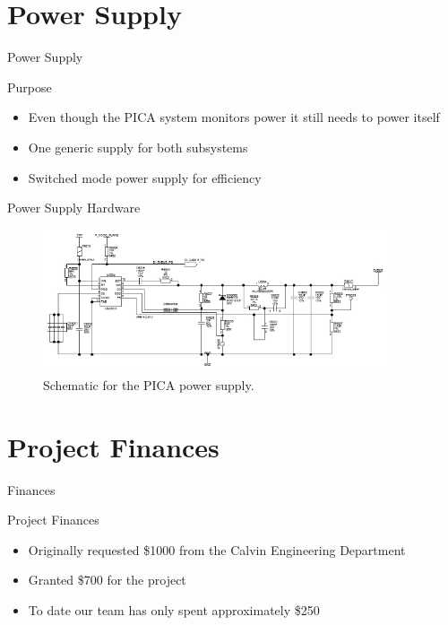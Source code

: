 \documentclass{beamer}
\begin{document}
\section{Power Supply}
\begin{frame}{Power Supply}
	\begin{block}{Purpose}
		\begin{itemize}
		\item <1 -> Even though the PICA system monitors power it still needs to power itself
		\item <2 -> One generic supply for both subsystems
		\item <3 -> Switched mode power supply for efficiency
		\end{itemize}
	\end{block}
\end{frame}

\begin{frame}{Power Supply Hardware}
	\begin{figure}[htbp]
	\begin{center}
	\includegraphics[width=4in]{includes/power_supply_schematic}
	\caption{Schematic for the PICA power supply.}
	\label{fig:ps_schematic}
	\end{center}
	\end{figure}
\end{frame}

\section{Project Finances}
\begin{frame}{Finances}
	\begin{block}{Project Finances}
		\begin{itemize}
		\item <1 -> Originally requested \$1000 from the Calvin Engineering Department
		\item <2 -> Granted \$700 for the project
		\item <3 -> To date our team has only spent approximately \$250
		\end{itemize}
	\end{block}
\end{frame}
\end{document}
